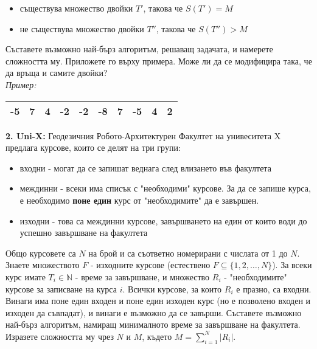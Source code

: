 \documentclass[fleqn,12pt]{article}
\begin{document}
\begin{flushleft}
\begin{itemize}
	\item съществува множество двойки $T'$, такова че $S(T')=M$
	\item не съществува множество двойки $T''$, такова че $S(T'') > M$
\end{itemize}

Съставете възможно най-бърз алгоритъм, решаващ задачата, и намерете сложността му. Приложете го върху примера. Може ли да се модифицира така, че да връща и самите двойки? \\
\vspace{5mm}
\textit{Пример: } \begin{tabular}{|c|c|c|c|c|c|c|c|c|c|} \hline -5 & 7 & 4 & -2 & -2 & -8 & 7 & -5 & 4 & 2 \\ \hline \end{tabular}

\vspace{10mm}
\textbf{2. Uni-X: } Геодезичния Робото-Архитектурен Факултет на унивеситета X предлага курсове, които се делят на три групи:

\begin{itemize}
	\item входни - могат да се запишат веднага след влизането във факултета
	\item междинни - всеки има списък с "необходими" курсове. За да се запише курса, е необходимо \textbf{поне един} курс от "необходимите" да е завършен.
	\item изходни - това са междинни курсове, завършването на един от които води до успешно завършване на факултета
\end{itemize}

Общо курсовете са $N$ на брой и са съответно номерирани с числата от 1 до $N$. Знаете множеството $F$ - изходните курсове (естествено $F \subseteq \{1,2, \dots, N\}$). За всеки курс имате $T_i \in \mathbb{N}$ - време за завършване, и множество $R_i$ - "необходимите" курсове за записване на курса $i$. Всички курсове, за които $R_i$ е празно, са входни. Винаги има поне един входен и поне един изходен курс (но е позволено входен и изходен да съвпадат), и винаги е възможно да се завърши. Съставете възможно най-бърз алгоритъм, намиращ минималното време за завършване на факултета. Изразете сложността му чрез $N$ и $M$, където $M = \sum_{i=1}^N |R_i|$.

\vspace{10mm}


\end{flushleft}
\end{document}
